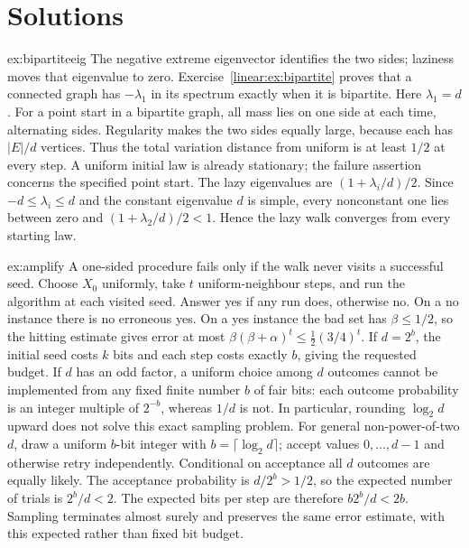 \section{Solutions}

\begin{solution}{ex:bipartiteeig}
\idea The negative extreme eigenvector identifies the two sides; laziness moves that eigenvalue to zero.
\writeup Exercise~\ref{linear:ex:bipartite} proves that a connected graph has $-\lambda_1$ in its spectrum exactly when it is bipartite. Here $\lambda_1=d$. For a point start in a bipartite graph, all mass lies on one side at each time, alternating sides. Regularity makes the two sides equally large, because each has $|E|/d$ vertices. Thus the total variation distance from uniform is at least $1/2$ at every step. A uniform initial law is already stationary; the failure assertion concerns the specified point start.
The lazy eigenvalues are $(1+\lambda_i/d)/2$. Since $-d\le\lambda_i\le d$ and the constant eigenvalue $d$ is simple, every nonconstant one lies between zero and $(1+\lambda_2/d)/2<1$. Hence the lazy walk converges from every starting law.
\end{solution}

\begin{solution}{ex:amplify}
\idea A one-sided procedure fails only if the walk never visits a successful seed.
\writeup Choose $X_0$ uniformly, take $t$ uniform-neighbour steps, and run the algorithm at each visited seed. Answer yes if any run does, otherwise no. On a no instance there is no erroneous yes. On a yes instance the bad set has $\beta\le1/2$, so the hitting estimate gives error at most $\beta(\beta+\alpha)^t\le\tfrac12(3/4)^t$.
If $d=2^b$, the initial seed costs $k$ bits and each step costs exactly $b$, giving the requested budget. If $d$ has an odd factor, a uniform choice among $d$ outcomes cannot be implemented from any fixed finite number $b$ of fair bits: each outcome probability is an integer multiple of $2^{-b}$, whereas $1/d$ is not. In particular, rounding $\log_2d$ upward does not solve this exact sampling problem.
For general non-power-of-two $d$, draw a uniform $b$-bit integer with $b=\lceil\log_2d\rceil$; accept values $0,\ldots,d-1$ and otherwise retry independently. Conditional on acceptance all $d$ outcomes are equally likely. The acceptance probability is $d/2^b>1/2$, so the expected number of trials is $2^b/d<2$. The expected bits per step are therefore $b2^b/d<2b$. Sampling terminates almost surely and preserves the same error estimate, with this expected rather than fixed bit budget.
\end{solution}

